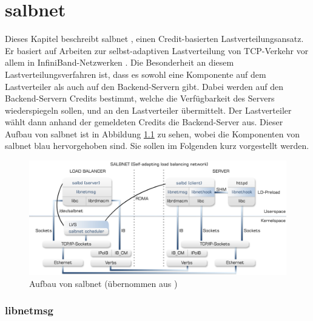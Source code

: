 \documentclass[a4paper, 12pt, BCOR10mm, DIV12, toc=bibliography, toc=listof, german]{scrbook}
\begin{document}


	\chapter{salbnet} %
	\label{cha:salbnet}

		Dieses Kapitel beschreibt salbnet \cite{salbnet}, einen Credit-basierten
		Lastverteilungsansatz.  Er basiert auf Arbeiten zur selbst-adaptiven Lastverteilung von
		TCP-Verkehr vor allem in InfiniBand-Netzwerken \cite{zinke2007, scsczile2008,
		schneidenbach2009}. Die Besonderheit an diesem Lastverteilungsverfahren ist, dass es sowohl eine
		Komponente auf dem Lastverteiler als auch auf den Backend-Servern gibt. Dabei werden auf den
		Backend-Servern Credits bestimmt, welche die Verfügbarkeit des Servers wiederspiegeln sollen,
		und an den Lastverteiler übermittelt. Der Lastverteiler wählt dann anhand der gemeldeten
		Credits die Backend-Server aus. Dieser Aufbau von salbnet ist in Abbildung \ref{fig:salbnet} zu
		sehen, wobei die Komponenten von salbnet blau hervorgehoben sind. Sie sollen im Folgenden kurz
		vorgestellt werden.

		\begin{figure}
			\centering
			\includegraphics[width=\textwidth]{images/salbnet.png}
			\caption{Aufbau von salbnet (übernommen aus \cite{zinke2012})}
			\label{fig:salbnet}
		\end{figure}

		\subsection*{libnetmsg} %
\end{document}
